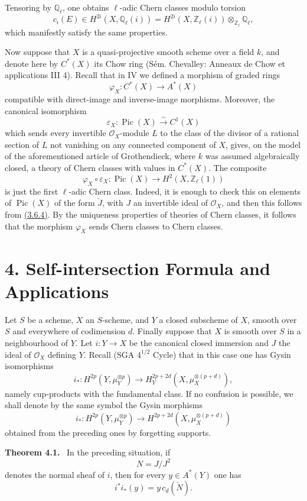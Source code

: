 \documentclass[11pt]{article}
\newenvironment{statement}[1]{\par\medskip\noindent\textbf{#1.}\ }{\par\medskip}
\providecommand{\Pic}{\operatorname{Pic}}
\begin{document}
Tensoring by $\mathbb Q_\ell$, one obtains $\ell$-adic Chern classes modulo torsion
\[
c_i(E)\in H^{2i}(X,\mathbb Q_\ell(i))
=H^{2i}(X,\mathbb Z_\ell(i))\otimes_{\mathbb Z_\ell}\mathbb Q_\ell,
\]
which manifestly satisfy the same properties.

Now suppose that $X$ is a quasi-projective smooth scheme over a field $k$, and denote here by $C^*(X)$ its Chow ring (Sém. Chevalley: Anneaux de Chow et applications III 4). Recall that in IV we defined a morphism of graded rings
\[
\varphi_X:C^*(X)\to A^*(X)
\]
compatible with direct-image and inverse-image morphisms. Moreover, the canonical isomorphism
\[
\varepsilon_X:\Pic(X)\xrightarrow{\sim} C^1(X)
\]
which sends every invertible $\mathcal O_X$-module $L$ to the class of the divisor of a rational section of $L$ not vanishing on any connected component of $X$, gives, on the model of the aforementioned article of Grothendieck, where $k$ was assumed algebraically closed, a theory of Chern classes with values in $C^*(X)$. The composite
\[
\varphi_X\circ\varepsilon_X:\Pic(X)\longrightarrow H^2(X,\mathbb Z_\ell(1))
\]
is just the first $\ell$-adic Chern class. Indeed, it is enough to check this on elements of $\Pic(X)$ of the form $\check J$, with $J$ an invertible ideal of $\mathcal O_X$, and then this follows from \hyperref[sga5:VII:equation:3.6.4]{(3.6.4)}. By the uniqueness properties of theories of Chern classes, it follows that the morphism $\varphi_X$ sends Chern classes to Chern classes.

\section*{4. Self-intersection Formula and Applications}\label{sga5:VII:section:4}

Let $S$ be a scheme, $X$ an $S$-scheme, and $Y$ a closed subscheme of $X$, smooth over $S$ and everywhere of codimension $d$. Finally suppose that $X$ is smooth over $S$ in a neighbourhood of $Y$. Let $i:Y\to X$ be the canonical closed immersion and $J$ the ideal of $\mathcal O_X$ defining $Y$. Recall (SGA $4^{1/2}$ Cycle) that in this case one has Gysin isomorphisms
\[
i_*:H^{2p}(Y,\mu_Y^{\otimes p})
\to H_Y^{2p+2d}(X,\mu_X^{\otimes(p+d)}),
\]
namely cup-products with the fundamental class. If no confusion is possible, we shall denote by the same symbol the Gysin morphisms
\[
i_*:H^{2p}(Y,\mu_Y^{\otimes p})
\to H^{2p+2d}(X,\mu_X^{\otimes(p+d)})
\]
obtained from the preceding ones by forgetting supports.

\label{sga5:VII:theorem:4.1}\begin{statement}{Theorem 4.1}
In the preceding situation, if
\[
N=J/J^2
\]
denotes the normal sheaf of $i$, then for every $y\in A^*(Y)$ one has
\[
i^*i_*(y)=y\,c_d(\check N).
\]
\end{statement}
\end{document}
